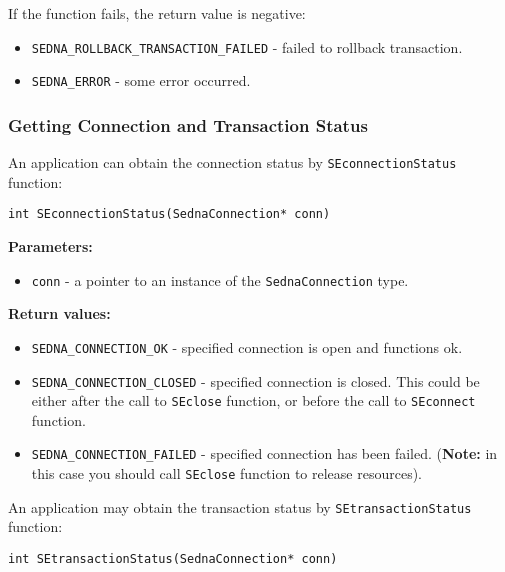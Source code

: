 \documentclass[a4paper,12pt]{article}
\newenvironment{citemize}
{\begin{itemize}
  \setlength{\itemsep}{0pt}
  \setlength{\parskip}{0pt}
  \setlength{\parsep}{0pt}}
{\end{itemize}}
\begin{document}
\noindent
If the function fails, the return value is negative:

\begin{citemize}
\item\verb!SEDNA_ROLLBACK_TRANSACTION_FAILED! - failed to rollback transaction.
\item\verb!SEDNA_ERROR! - some error occurred.
\end{citemize}


\subsubsection{Getting Connection and Transaction Status}

An application can obtain the connection status by \verb!SEconnectionStatus!
function:

\begin{verbatim}
int SEconnectionStatus(SednaConnection* conn)
\end{verbatim}

\noindent
\textbf{Parameters:}

\begin{citemize}
\item\verb!conn! - a pointer to an instance of the \verb!SednaConnection! type.
\end{citemize}

\noindent
\textbf{Return values:}

\medskip

\begin{citemize}
\item\verb!SEDNA_CONNECTION_OK! - specified connection is open and functions ok.
\item\verb!SEDNA_CONNECTION_CLOSED! - specified connection is closed. This could
be either after the call to \verb!SEclose! function, or before the call to
\verb!SEconnect! function.
\item\verb!SEDNA_CONNECTION_FAILED! - specified connection has been failed.
(\textbf{Note:} in this case you should call \verb!SEclose! function to release
resources).
\end{citemize}

An application may obtain the transaction status by \verb!SEtransactionStatus!
function:

\begin{verbatim}
int SEtransactionStatus(SednaConnection* conn)
\end{verbatim}
\end{document}
